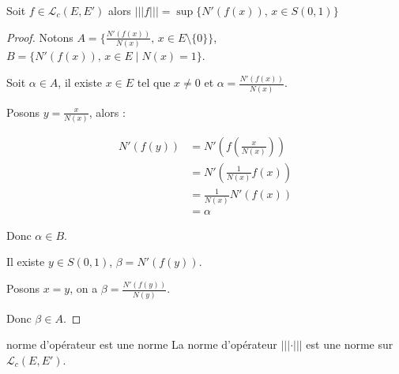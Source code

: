 \begin{proposition}{}{}
    Soit $f \in \mathscr L_c(E, E')$ alors $|||f||| = \sup \{ N'(f(x)), \, x \in S(0, 1) \}$
\end{proposition}

\begin{proof}
    Notons $A = \{\frac{N'(f(x))}{N(x)}, \, x \in E \setminus \{0\}\}$,
    $B = \{N'(f(x)), \, x \in E \mid N(x) = 1\}$.

    Soit $\alpha \in A$, il existe $x \in E $ tel que $x \neq 0$ et $\alpha = \frac{N'(f(x))}{N(x)}$.

    Posons $y = \frac x {N(x)}$, alors : 

    \begin{align*}
        N'(f(y)) & = N'\left( f\left( \frac x {N(x)} \right) \right) \\
        & = N'\left( \frac{1}{N(x)} f(x) \right) \\
        & = \frac{1}{N(x)} N'(f(x)) \\
        & = \alpha
    \end{align*}

    Donc $\alpha \in B$. 

    Il existe $y \in S(0, 1)$, $\beta = N'(f(y))$. 

    Posons $x = y$, on a $\beta = \frac{N'(f(y))}{N(y)}$. 

    Donc $\beta \in A$.
\end{proof}


\begin{theoreme}{norme d'opérateur est une norme }{}
    La norme d'opérateur $|||\cdot|||$ est une norme sur $\mathscr L_c(E, E')$.
\end{theoreme}


